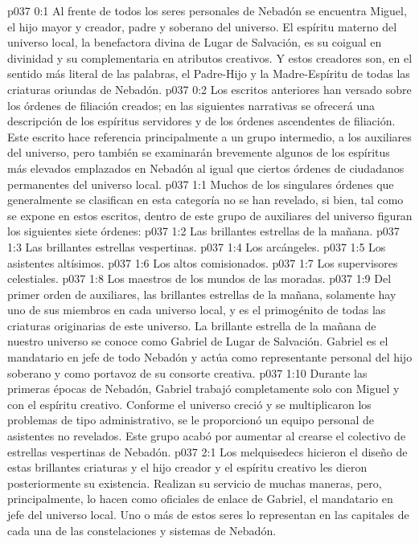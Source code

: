 \author{Estrella vespertina}
\vs p037 0:1 Al frente de todos los seres personales de Nebadón se encuentra Miguel, el hijo mayor y creador, padre y soberano del universo. El espíritu materno del universo local, la benefactora divina de Lugar de Salvación, es su coigual en divinidad y su complementaria en atributos creativos. Y estos creadores son, en el sentido más literal de las palabras, el Padre\hyp{}Hijo y la Madre\hyp{}Espíritu de todas las criaturas oriundas de Nebadón.
\vs p037 0:2 Los escritos anteriores han versado sobre los órdenes de filiación creados; en las siguientes narrativas se ofrecerá una descripción de los espíritus servidores y de los órdenes ascendentes de filiación. Este escrito hace referencia principalmente a un grupo intermedio, a los auxiliares del universo, pero también se examinarán brevemente algunos de los espíritus más elevados emplazados en Nebadón al igual que ciertos órdenes de ciudadanos permanentes del universo local.
\vs p037 1:1 Muchos de los singulares órdenes que generalmente se clasifican en esta categoría no se han revelado, si bien, tal como se expone en estos escritos, dentro de este grupo de auxiliares del universo figuran los siguientes siete órdenes:
\vs p037 1:2 Las brillantes estrellas de la mañana.
\vs p037 1:3 Las brillantes estrellas vespertinas.
\vs p037 1:4 Los arcángeles.
\vs p037 1:5 Los asistentes altísimos.
\vs p037 1:6 Los altos comisionados.
\vs p037 1:7 Los supervisores celestiales.
\vs p037 1:8 Los maestros de los mundos de las moradas.
\vs p037 1:9 \pc Del primer orden de auxiliares, las brillantes estrellas de la mañana, solamente hay uno de sus miembros en cada universo local, y es el primogénito de todas las criaturas originarias de este universo. La brillante estrella de la mañana de nuestro universo se conoce como Gabriel de Lugar de Salvación. Gabriel es el mandatario en jefe de todo Nebadón y actúa como representante personal del hijo soberano y como portavoz de su consorte creativa.
\vs p037 1:10 Durante las primeras épocas de Nebadón, Gabriel trabajó completamente solo con Miguel y con el espíritu creativo. Conforme el universo creció y se multiplicaron los problemas de tipo administrativo, se le proporcionó un equipo personal de asistentes no revelados. Este grupo acabó por aumentar al crearse el colectivo de estrellas vespertinas de Nebadón.
\vs p037 2:1 Los melquisedecs hicieron el diseño de estas brillantes criaturas y el hijo creador y el espíritu creativo les dieron posteriormente su existencia. Realizan su servicio de muchas maneras, pero, principalmente, lo hacen como oficiales de enlace de Gabriel, el mandatario en jefe del universo local. Uno o más de estos seres lo representan en las capitales de cada una de las constelaciones y sistemas de Nebadón.
